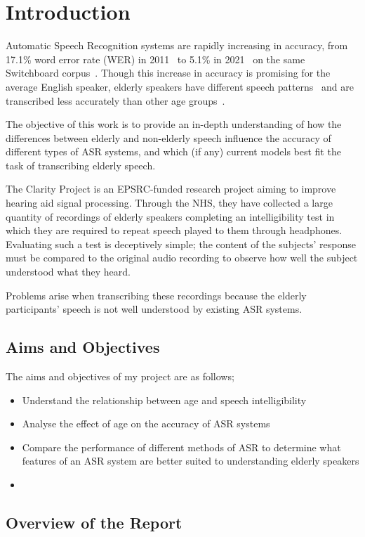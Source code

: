 \chapter{Introduction}\label{ch:introduction}

Automatic Speech Recognition systems are rapidly increasing in accuracy, from 17.1\% word error
rate (WER) in 2011~\cite{seide2011} to 5.1\% in 2021~\cite{Ng2021} on the same Switchboard
corpus~\cite{switchboard}.
Though this increase in accuracy is promising for the average English speaker, elderly speakers
have different speech patterns~\cite{Horton2010} and are transcribed less accurately than other age
groups~\cite{picone1990}.

The objective of this work is to provide an in-depth understanding of how the differences
between elderly and non-elderly speech influence the accuracy of different types of ASR systems,
and which (if any) current models best fit the task of transcribing elderly speech.

The Clarity Project is an EPSRC-funded research project aiming to improve hearing aid signal
processing.
Through the NHS, they have collected a large quantity of recordings of elderly speakers
completing an intelligibility test in which they are required to repeat speech played to them
through headphones.
Evaluating such a test is deceptively simple;
the content of the subjects' response must be compared to the original audio recording to observe
how well the subject understood what they heard.

Problems arise when transcribing these recordings because the elderly participants' speech is not
well understood by existing ASR systems.

\section{Aims and Objectives}\label{sec:aims-and-objectives}

The aims and objectives of my project are as follows;

\begin{itemize}
    \item Understand the relationship between age and speech intelligibility
    \item Analyse the effect of age on the accuracy of ASR systems
    \item Compare the performance of different methods of ASR to determine what features of an
    ASR system are better suited to understanding elderly speakers
    \item
\end{itemize}


\section{Overview of the Report}\label{sec:overview-of-the-report}

